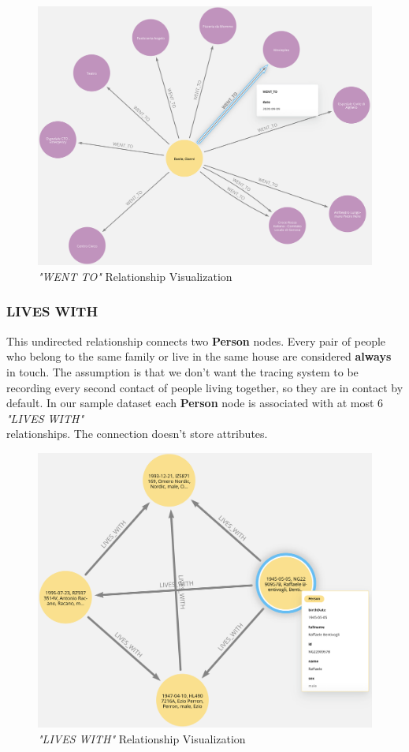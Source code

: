 \documentclass{article}[IEEEtran]
\begin{document}
\begin{figure}[H]
\begin{center}
\includegraphics[width=0.56\linewidth, frame]{WENT_TO.png}
\caption{\emph{"WENT TO"} Relationship Visualization}
\end{center}
\end{figure}

\subsubsection{LIVES WITH}

This undirected relationship connects two \textbf{Person} nodes. 
Every pair of people who belong to the same family or live in the same house are considered \textbf{always} in touch. The assumption is that we don’t want the tracing system to be recording every second contact of people living together, so they are in contact by default. In our sample dataset each \textbf{Person} node is associated with at most 6 \emph{"LIVES WITH"} \\ relationships.
The connection doesn't store attributes.

\begin{figure}[H]
\begin{center}
\includegraphics[width=0.56\linewidth, frame]{LIVES_WITH.png}
\caption{\emph{"LIVES WITH"} Relationship Visualization}
\end{center}
\end{figure}
\end{document}
